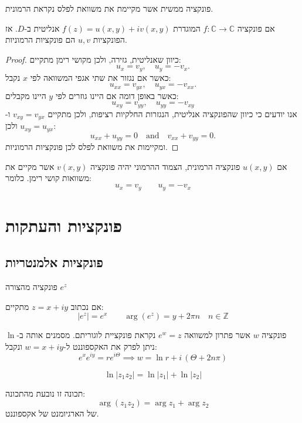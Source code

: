 \documentclass{tstextbook}
\begin{document}
\begin{definition}
פונקציה ממשית אשר מקיימת את משוואת לפלס נקראת הרמונית.

\end{definition}
\begin{theorem}
אם פונקציה \(f:\mathbb{C}\to \mathbb{C}\) המוגדרת \(f(z)=u(x,y)+iv(x,y)\) אנליטית ב-\(D\). אז הפונקציות \(u,v\) הם פונקציות הרמוניות.

\end{theorem}
\begin{proof}
כיוון שאנליטית, גזירה, ולכן מקושי רימן מתקיים:
$$u_{x}=v_{y},\quad u_{y}=-v_{x}.$$
כאשר אם נגזור את שתי אגפי המשוואה לפי \(x\) נקבל:
$$u_{x x}=v_{y x},\quad u_{y x}=-v_{x x}.$$
כאשר באופן דומה אם היינו גוזרים לפי \(y\) היינו מקבלים:
$$u_{x y}=v_{y y},\quad u_{y y}=-v_{x y}$$
אנו יודעים כי כיוון שהפונקציה אנליטית, הנגזרות החלקיות רציפות, ולכן מתקיים \(v_{xy}=v_{yx}\) ו-\(u_{xy}=u_{yx}\) ולכן:
$$u_{x x}+u_{y y}=0\quad{\mathrm{and}}\quad v_{x x}+v_{y y}=0.$$
ומקיימות את משוואת לפלס לכן פונקציות הרמוניות.

\end{proof}
\begin{definition}
אם \(u(x,y)\) פונקציה הרמונית, הצמוד ההרמוני יהיה פונקציה \(v(x,y)\) אשר מקיים את משוואות קושי רימן. כלומר:
$$u_{x}=v_{y}\qquad u_{y}=-v_{x}$$

\end{definition}
\section{פונקציות והעתקות}

\subsection{פונקציות אלמנטריות}

\begin{definition}
פונקציה מהצורה \(e^z\)

\end{definition}
\begin{proposition}
אם נכתוב \(z=x+iy\) מתקיים:
$$\lvert e^z \rvert =e^x\qquad \arg(e^z)=y+2\pi n\quad n\in \mathbb{Z}$$

\end{proposition}
\begin{definition}
פונקציה \(w\) אשר פתרון למשוואה \(e^w=z\) נקראת פונקציית לוגוריתם. מסמנים אותה ב-\(\ln\) ניתן לפרק את האקספוננט ל-\(w=x+iy\) ונקבל:
$$e^xe^{iy}=re^{i\Theta} \implies w=\ln r+i\,\left( \Theta+2n\pi 
\right)$$

\end{definition}
\begin{proposition}
$$\ln|z_{1}z_{2}|=\ln|z_{1}|+\ln|z_{2}|$$

\end{proposition}
תכונה זו נובעת מהתכונה:
$$\arg(z_{1}z_{2})=\arg z_{1}+\arg z_{2}$$
של הארגיומנט של אקספוננט.
\end{document}
